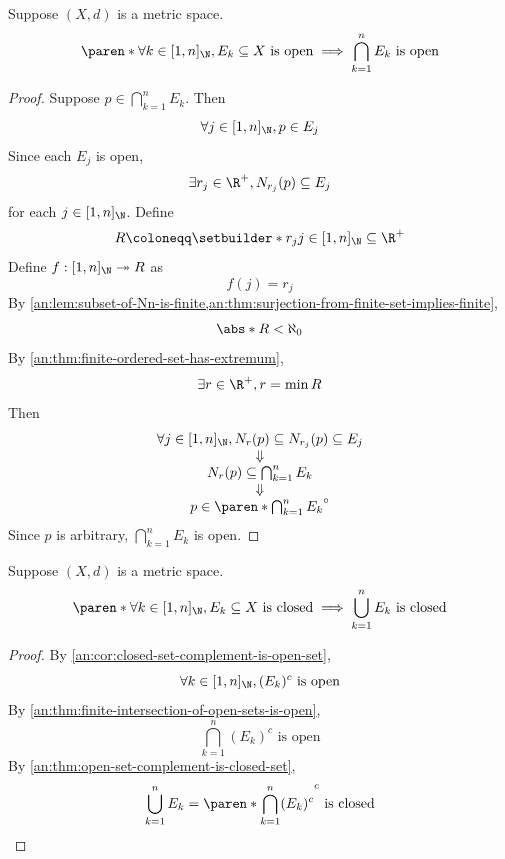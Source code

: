 \begin{theorem} \label{an:thm:finite-intersection-of-open-sets-is-open}
  Suppose $(X, d)$ is a metric space.
  \[
    \paren*{\forall k \in [1, n]_{\N}, E_{k} \subseteq X \text{ is open}} \implies \bigcap_{k = 1}^{n} E_{k} \text{ is open}
  \]
\end{theorem}

\begin{proof}
  Suppose $p \in \bigcap_{k = 1}^{n} E_{k}$. Then
  \[
    \forall j \in [1, n]_{\N}, p \in E_{j}
  \]
  Since each $E_{j}$ is open,
  \[
    \exists r_{j} \in \R^{+}, N_{r_{j}}(p) \subseteq E_{j}
  \]
  for each $j \in [1, n]_{\N}$. Define
  \[
    R \coloneqq \setbuilder*{r_{j}}{j \in [1, n]_{\N}} \subseteq \R^{+}
  \]
  Define $f: [1, n]_{\N} \twoheadrightarrow R$ as
  \[
    f(j) = r_{j}
  \]
  By \cref{an:lem:subset-of-Nn-is-finite,an:thm:surjection-from-finite-set-implies-finite},
  \[
    \abs*{R} < \aleph_{0}
  \]
  By \cref{an:thm:finite-ordered-set-has-extremum},
  \[
    \exists r \in \R^{+}, r = \min R
  \]
  Then
  \[
    \begin{array}{c}
      \forall j \in [1, n]_{\N}, N_{r}(p) \subseteq N_{r_{j}}(p) \subseteq E_{j} \\
      \Downarrow                                                                 \\
      N_{r}(p) \subseteq \bigcap_{k = 1}^{n} E_{k}                               \\
      \Downarrow                                                                 \\
      p \in \paren*{\bigcap_{k = 1}^{n} E_{k}}^{\circ}
    \end{array}
  \]
  Since $p$ is arbitrary, $\bigcap_{k = 1}^{n} E_{k}$ is open.
\end{proof}

\bigskip

\begin{corollary} \label{an:cor:finite-union-of-closed-sets-is-closed}
  Suppose $(X, d)$ is a metric space.
  \[
    \paren*{\forall k \in [1, n]_{\N}, E_{k} \subseteq X \text{ is closed}} \implies \bigcup_{k = 1}^{n} E_{k} \text{ is closed}
  \]
\end{corollary}

\begin{proof}
  By \cref{an:cor:closed-set-complement-is-open-set},
  \[
    \forall k \in [1, n]_{\N}, (E_{k})^{c} \text{ is open}
  \]
  By \cref{an:thm:finite-intersection-of-open-sets-is-open},
  \[
    \bigcap_{k = 1}^{n} (E_{k})^{c} \text{ is open}
  \]
  By \cref{an:thm:open-set-complement-is-closed-set},
  \[
    \bigcup_{k = 1}^{n} E_{k} = \paren*{\bigcap_{k = 1}^{n} (E_{k})^{c}}^{c} \text{ is closed}
  \]
\end{proof}

